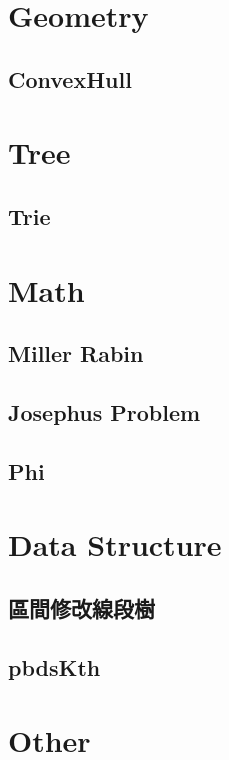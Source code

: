 \section{Geometry}
		\subsection{ConvexHull}
		

\section{Tree}
		\subsection{Trie}
		
				
\section{Math}
		\subsection{Miller Rabin}
		
		\subsection{Josephus Problem}
		
		\subsection{Phi}
		
		
\section{Data Structure}
		\subsection{區間修改線段樹}
		
		\subsection{pbdsKth}
		
		
		
\section{Other}
